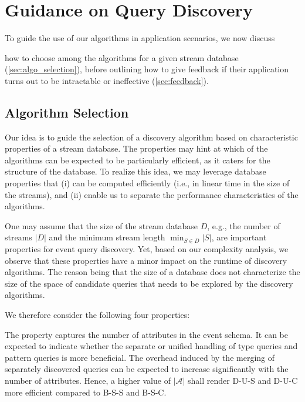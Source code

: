 \section{Guidance on Query Discovery}
\label{sec:instantiation}

To guide the use of our algorithms in application scenarios, we now discuss

how to choose among the algorithms for a
given stream database
(\autoref{sec:algo_selection}), before outlining how to give feedback if
their application turns out to be intractable or ineffective
(\autoref{sec:feedback}).



\subsection{Algorithm Selection}
\label{sec:algo_selection}
Our idea is to guide the selection of a discovery algorithm based on
characteristic properties of a stream database. The properties may hint at
which of the algorithms can be expected to be particularly
efficient, as it caters for the structure of the
database. To realize this idea, we may leverage database properties that
(i) can be computed efficiently (i.e., in linear time in
the size of the streams), and (ii) enable us to separate the
performance characteristics of the algorithms.


One may assume that the size
of the stream database $D$, e.g., the number of streams $|D|$ and the
minimum
stream length $\min_{S\in D}|S|$, are important properties for event query
discovery. Yet,
based on our complexity analysis, we observe that these properties have a
minor impact on the runtime of discovery
algorithms. The reason being that the size of a database does not
characterize the size of the space of candidate queries that needs to be
explored by the discovery algorithms.

We therefore consider the following
four properties:

 The property captures the
number of attributes in the event schema.
It can be expected to indicate whether the separate or unified
handling of type queries and pattern queries is more beneficial. The
overhead induced by the merging of separately discovered queries can be
expected to increase significantly with the number of
attributes. Hence, a higher value of $|\mathcal{A}|$ shall render D-U-S
and D-U-C more efficient compared to B-S-S and B-S-C.

